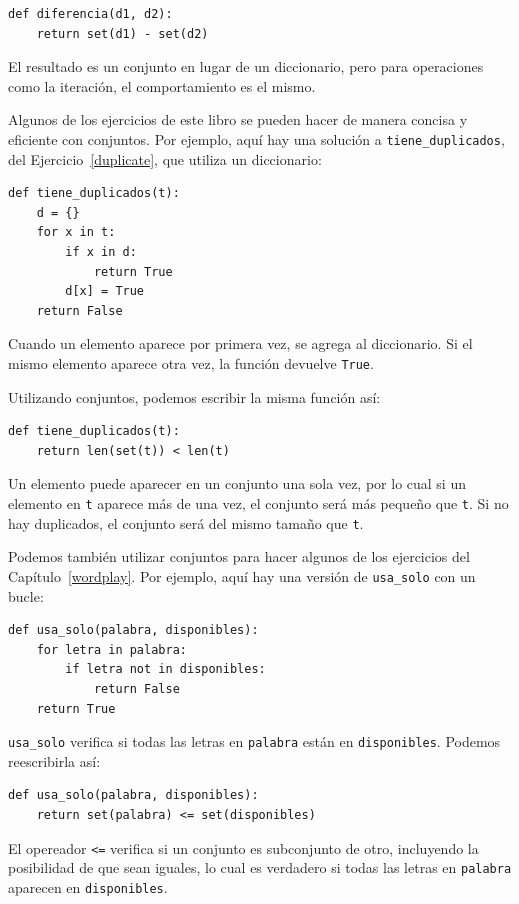 \documentclass[10pt]{book}
\begin{document}
\begin{verbatim}
def diferencia(d1, d2):
    return set(d1) - set(d2)
\end{verbatim}
%
El resultado es un conjunto en lugar de un diccionario, pero para operaciones como
la iteración, el comportamiento es el mismo.

Algunos de los ejercicios de este libro se pueden hacer de manera concisa y
eficiente con conjuntos.  Por ejemplo, aquí hay una solución a
\verb"tiene_duplicados", del
Ejercicio~\ref{duplicate}, que utiliza un diccionario:

\begin{verbatim}
def tiene_duplicados(t):
    d = {}
    for x in t:
        if x in d:
            return True
        d[x] = True
    return False
\end{verbatim}

Cuando un elemento aparece por primera vez, se agrega al
diccionario.  Si el mismo elemento aparece otra vez, la función devuelve
{\tt True}.

Utilizando conjuntos, podemos escribir la misma función así:

\begin{verbatim}
def tiene_duplicados(t):
    return len(set(t)) < len(t)
\end{verbatim}
%
Un elemento puede aparecer en un conjunto una sola vez, por lo cual si un elemento en {\tt t}
aparece más de una vez, el conjunto será más pequeño que {\tt t}.  Si no
hay duplicados, el conjunto será del mismo tamaño que {\tt t}.

Podemos también utilizar conjuntos para hacer algunos de los ejercicios del
Capítulo~\ref{wordplay}.  Por ejemplo, aquí hay una versión de
\verb"usa_solo" con un bucle:

\begin{verbatim}
def usa_solo(palabra, disponibles):
    for letra in palabra:
        if letra not in disponibles:
            return False
    return True
\end{verbatim}
%
\verb"usa_solo" verifica si todas las letras en {\tt palabra} están
en {\tt disponibles}.  Podemos reescribirla así:

\begin{verbatim}
def usa_solo(palabra, disponibles):
    return set(palabra) <= set(disponibles)
\end{verbatim}
%
El opereador \verb"<=" verifica si un conjunto es subconjunto de otro,
incluyendo la posibilidad de que sean iguales, lo cual es verdadero si todas
las letras en {\tt palabra} aparecen en {\tt disponibles}.
\end{document}

